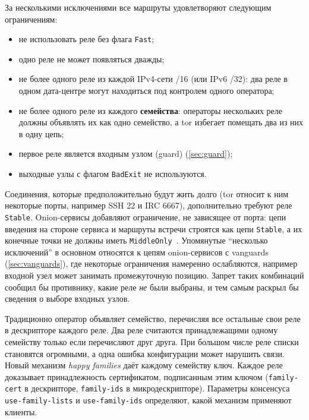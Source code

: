 За несколькими исключениями все маршруты удовлетворяют следующим ограничениям:
\begin{itemize}
  \item не использовать реле без флага \texttt{Fast};
  \item одно реле не может появляться дважды;
  \item не более одного реле из каждой IPv4-сети /16 (или IPv6 /32): два реле в одном дата-центре могут находиться под контролем одного оператора;
  \item не более одного реле из каждого \textbf{семейства}: операторы нескольких реле должны объявлять их как одно семейство, а tor избегает помещать два из них в одну цепь;
  \item первое реле является входным узлом (guard) (\cref{sec:guard});
  \item выходные узлы с флагом \texttt{BadExit} не используются.
\end{itemize}
Соединения, которые предположительно будут жить долго (tor относит к ним некоторые порты, например SSH 22 и IRC 6667), дополнительно требуют реле \texttt{Stable}. Onion-сервисы добавляют ограничение, не зависящее от порта: цепи введения на стороне сервиса и маршруты встречи строятся как цепи \texttt{Stable}, а их конечные точки не должны иметь \texttt{MiddleOnly}~. Упомянутые \enquote{несколько исключений} в основном относятся к цепям onion-сервисов с vanguards (\cref{sec:vanguards}), где некоторые ограничения намеренно ослабляются, например входной узел может занимать промежуточную позицию. Запрет таких комбинаций сообщил бы противнику, какие реле \emph{не} были выбраны, и тем самым раскрыл бы сведения о выборе входных узлов.

\begin{approfondimento}
Традиционно оператор объявляет семейство, перечисляя все остальные свои реле в дескрипторе каждого реле. Два реле считаются принадлежащими одному семейству только если перечисляют друг друга. При большом числе реле списки становятся огромными, а одна ошибка конфигурации может нарушить связи. Новый механизм \emph{happy families} даёт каждому семейству ключ. Каждое реле доказывает принадлежность сертификатом, подписанным этим ключом (\texttt{family-cert} в дескрипторе, \texttt{family-ids} в микродескрипторе). Параметры консенсуса \texttt{use-family-lists} и \texttt{use-family-ids} определяют, какой механизм применяют клиенты.
\end{approfondimento}

